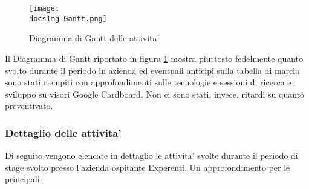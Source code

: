 \begin{figure}[H]
	\centering
	\texttt{[image: \\docsImg Gantt.png]}
	\caption{Diagramma di Gantt delle attivita'}
	\label{fig:Diagramma di Gantt delle attivita'}
\end{figure}

Il Diagramma di Gantt riportato in figura \ref{fig:Diagramma di Gantt delle attivita'} mostra piuttosto fedelmente quanto svolto durante il periodo in azienda ed eventuali anticipi sulla tabella di marcia sono stati riempiti con approfondimenti sulle tecnologie e sessioni di ricerca e sviluppo su visori Google Cardboard. Non ci sono stati, invece, ritardi su quanto preventivato.

\subsubsection{Dettaglio delle attivita'}
Di seguito vengono elencate in dettaglio le attivita' svolte durante il periodo di stage svolto presso l'azienda ospitante Experenti. Un approfondimento per le principali. 

